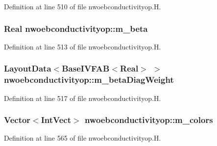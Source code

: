 Definition at line 510 of file nwoebconductivityop.\+H.

\subsubsection[{\texorpdfstring{m\+\_\+beta}{m_beta}}]{\setlength{\rightskip}{0pt plus 5cm}Real nwoebconductivityop\+::m\+\_\+beta\hspace{0.3cm}{\ttfamily [protected]}}\hypertarget{classnwoebconductivityop_a745228a1241eae2d91dac033b49f889a}{}\label{classnwoebconductivityop_a745228a1241eae2d91dac033b49f889a}


Definition at line 513 of file nwoebconductivityop.\+H.

\subsubsection[{\texorpdfstring{m\+\_\+beta\+Diag\+Weight}{m_betaDiagWeight}}]{\setlength{\rightskip}{0pt plus 5cm}Layout\+Data$<$Base\+I\+V\+F\+AB$<$Real$>$ $>$ nwoebconductivityop\+::m\+\_\+beta\+Diag\+Weight\hspace{0.3cm}{\ttfamily [protected]}}\hypertarget{classnwoebconductivityop_a4075b257970b30d2e5e6c29545fec0e7}{}\label{classnwoebconductivityop_a4075b257970b30d2e5e6c29545fec0e7}


Definition at line 517 of file nwoebconductivityop.\+H.

\subsubsection[{\texorpdfstring{m\+\_\+colors}{m_colors}}]{\setlength{\rightskip}{0pt plus 5cm}Vector$<$Int\+Vect$>$ nwoebconductivityop\+::m\+\_\+colors\hspace{0.3cm}{\ttfamily [protected]}}\hypertarget{classnwoebconductivityop_a457b049944b6be8ddcf860088639ac6c}{}\label{classnwoebconductivityop_a457b049944b6be8ddcf860088639ac6c}


Definition at line 565 of file nwoebconductivityop.\+H.


